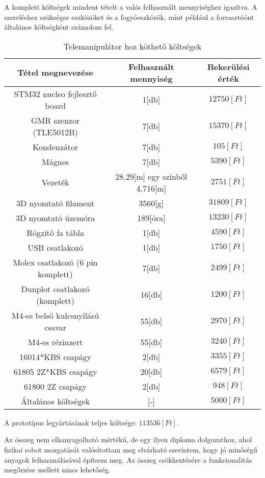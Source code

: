 A komplett költségek mindent tételt a valós felhasznált mennyiséghez igazítva. A szereléshez szükséges eszközöket és a fogyóeszközök, mint például a forrasztóónt általános költségként számolom fel.

\begin{table}[!ht]
\centering
\begin{tabular}{ |c|c|c| }
 \hline
 Tétel megnevezése & Felhasznált mennyiség & Bekerülési érték  \\
 \hline
   \hline
 STM32 nucleo fejlesztő board & 1[db] & $12750[Ft]$  \\
 \hline
 GMR szenzor (TLE5012B) & 7[db] & $15370[Ft]$  \\
 \hline
 Kondenzátor & 7[db] & $105[Ft]$  \\
 \hline
 Mágnes & 7[db] & $5390[Ft]$  \\
 \hline
 Vezeték & 28,29[m] egy színből 4,716[m] & $2751[Ft]$  \\
 \hline
 3D nyomtató filament & 3560[g] & $31809[Ft]$  \\
 \hline
 3D nyomtató üzemóra & 189[óra] & $13230[Ft]$ \\
 \hline
 Rögzítő fa tábla & 1[db] & $4590[Ft]$  \\
 \hline
 USB csatlakozó & 1[db] & $1750[Ft]$  \\
 \hline
 Molex csatlakozó (6 pin komplett)& 7[db] & $2499[Ft]$  \\  
 \hline
 Dunplot csatlakozó (komplett) & 16[db] & $1200[Ft]$  \\
 \hline
 M4-es belső kulcsnyílású csavar & 55[db] & $2970[Ft]$  \\
 \hline
 M4-es rézinzert & 55[db] & $3240[Ft]$  \\
 \hline
 16014*KBS csapágy & 2[db] & $3355[Ft]$  \\
 \hline
 61805 2Z*KBS csapágy & 20[db] & $6579[Ft]$  \\
 \hline
 61800 2Z csapágy & 2[db] & $948[Ft]$  \\
\hline
Általános költségek & [-] & $5000[Ft]$ \\
\hline
\end{tabular}
\caption{Telemanipulátor hoz köthető költségek}
\label{table:Koltsegek}
\end{table}

A prototípus legyártásának teljes költsége: $113536[Ft]$.

Az összeg nem elhanyagolható mértékű, de egy ilyen diploma dolgozathoz, ahol fizikai robot mozgatását valósítottam meg elvárható szerintem, hogy jó minőségű anyagok felhasználásával építsem meg. Az összeg csökkentésére a funkcionalitás megőrzése mellett nincs lehetőség.

